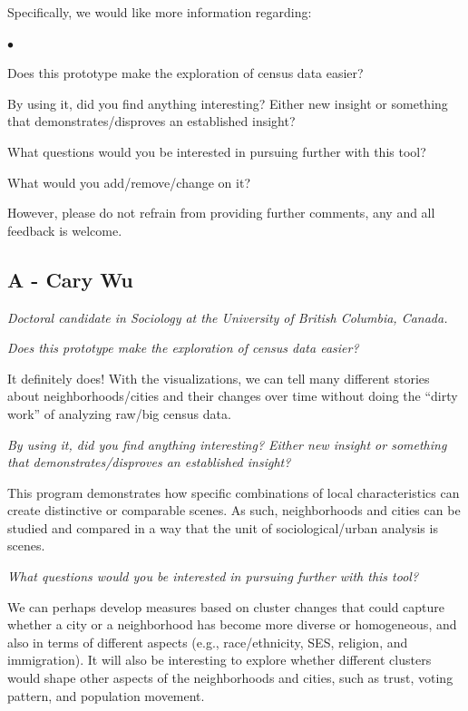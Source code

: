 \documentclass[a4paper]{article}
\newcommand{\question}[1]{\smallskip\noindent\emph{#1}}
\newcommand{\squishlist}{
 \begin{list}{$\bullet$}
  { \setlength{\itemsep}{0pt}
     \setlength{\parsep}{3pt}
     \setlength{\topsep}{3pt}
     \setlength{\partopsep}{0pt}
     \setlength{\leftmargin}{1.5em}
     \setlength{\labelwidth}{1em}
     \setlength{\labelsep}{0.5em} } }
\newcommand{\squishend}{
  \end{list}  }
\begin{document}
Specifically, we would like more information regarding:
\squishlist
    \item{Does this prototype make the exploration of census data easier?}
    \item{By using it, did you find anything interesting? Either new insight or something that demonstrates/disproves an established insight? }
    \item{What questions would you be interested in pursuing further with this tool? }
    \item{What would you add/remove/change on it?}
\squishend

However, please do not refrain from providing further comments, any and all
feedback is welcome. 



\subsection{A - Cary Wu}
\emph{Doctoral candidate in Sociology at the University of British Columbia, Canada.}

\question{Does this prototype make the exploration of census data easier?}
 

It definitely does! With the visualizations, we can tell many different stories
about neighborhoods/cities and their changes over time without doing the “dirty
work” of analyzing raw/big census data.
 

 

\question{By using it, did you find anything interesting? Either new insight or
something that demonstrates/disproves an established insight? }
 

This program demonstrates how specific combinations of local characteristics can
create distinctive or comparable scenes. As such, neighborhoods and cities can
be studied and compared in a way that the unit of sociological/urban analysis is
scenes.
 
 
\question{What questions would you be interested in pursuing further with this tool?}
 

We can perhaps develop measures based on cluster changes that could capture
whether a city or a neighborhood has become more diverse or homogeneous, and
also in terms of different aspects (e.g., race/ethnicity, SES, religion, and
immigration). It will also be interesting to explore whether different clusters
would shape other aspects of the neighborhoods and cities, such as trust, voting
pattern, and population movement.
 
\end{document}
